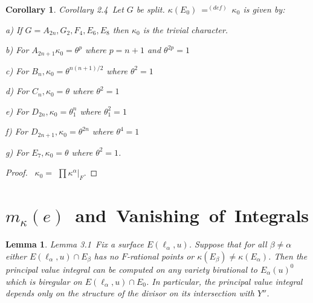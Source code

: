 \documentclass{memo-l}
\newtheorem{lemma}[theorem]{Lemma}
\newtheorem{corollary}[theorem]{Corollary}
\theoremstyle{definition}
\theoremstyle{remark}
\numberwithin{section}{chapter}
\numberwithin{equation}{chapter}
\begin{document}
{\medskip}

\begin{corollary}{Corollary 2.4}\  Let $G$ be split.
${\kappa}(E_{0})\ {\mathrel{\mathop=^{(def)}}}\ {\kappa}_{0}$ is given by:

a) If $G = A_{2n}, G_{2}, F_{4}, E_{6}, E_{8}$ then ${\kappa}_{0}$ is the
trivial character.

b) For $A_{2n+1} {\kappa}_{0}  =  {\theta}^{p}$ where $p = n+1$ and
${\theta}^{2p} = 1$

c) For $B_{n}, {\kappa}_{0}  =  {\theta}^{n(n+1)/2}$ where
${\theta}^{2} = 1$

d) For $C_{n}, {\kappa}_{0}  =  {\theta}$ where ${\theta}^{2} = 1$

e) For $D_{2n}, {\kappa}_{0}  =  {\theta}_{1}^{n}$ where ${\theta}_{1}^{2} = 1$

f) For $D_{2n+1}, {\kappa}_{0}  =  {\theta}^{2n}$ where ${\theta}^{4} = 1$

g) For $E_{7}, {\kappa}_{0}  =  {\theta}$ where ${\theta}^{2} = 1$.
\end{corollary}


\begin{proof} \  ${\kappa}_{0}  = $ $\prod{\kappa}^{{\alpha}}\vert_{F} .$
\end{proof}


\section{$m_{{\kappa}}(e)$\ and\ Vanishing\ of\ Integrals}


\begin{lemma}{Lemma 3.1}\ Fix a surface $E({\ell}_{{\alpha}},u)$.  Suppose
that for all ${\beta} \ne {\alpha}$ either $E({\ell}_{{\alpha}},u)  \cap
E_{{\beta}}$ has no $F$-rational points or ${\kappa}(E_{{\beta}})  \ne
{\kappa}(E_{{\alpha}})$.  Then the principal value integral can be computed
on any variety birational to $E_{{\alpha}}(u)^{0}$ which is biregular on
$E({\ell}_{{\alpha}},u)  \cap  E_{0}$.  In particular, the principal value
integral depends only on the structure of the divisor on its intersection
with $Y''$.
\end{lemma}
\end{document}
